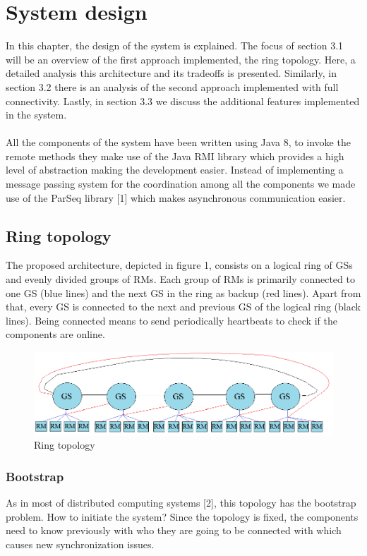 \section{System design}
In this chapter, the design of the system is explained.
The focus of section 3.1 will be an overview of the first approach implemented, the ring topology. Here, a detailed analysis this architecture and its tradeoffs is presented. Similarly, in section 3.2 there is an analysis of the second approach implemented with full connectivity. Lastly, in section 3.3 we discuss the additional features implemented in the system. \\\\
All the components of the system have been written using Java 8, to invoke the remote methods they make use of the Java RMI library which provides a high level of abstraction making the development easier. Instead of implementing a message passing system for the coordination among all the components we made use of the ParSeq library [1] which makes asynchronous communication easier. 

\subsection{Ring topology}

The proposed architecture, depicted in figure 1, consists on a logical ring of GSs and evenly divided groups of RMs.
Each group of RMs is primarily connected to one GS (blue lines) and the next GS in the ring as backup (red lines). Apart from that, every GS is connected to the next and previous GS of the logical ring (black lines). Being connected means to send periodically heartbeats to check if the components are online. 
\\ 
\begin{figure}[H]
\centering
	\includegraphics[scale=0.61]{ring.png}
	\caption{Ring topology}
\end{figure}

\subsubsection{Bootstrap}
As in most of distributed computing systems [2], this topology has the bootstrap problem. How to initiate the system? Since the topology is fixed, the components need to know previously with who they are going to be connected with which causes new synchronization issues.

